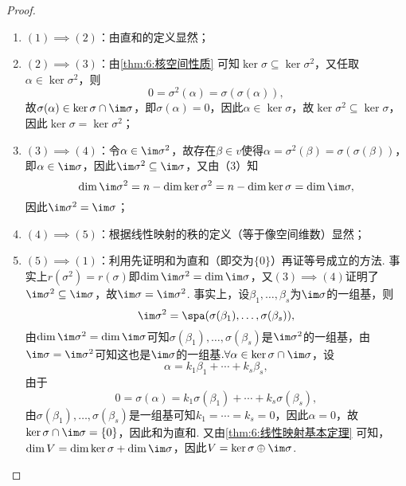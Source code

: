 \begin{enumerate}
          \begin{proof}
              \begin{enumerate}
                  \item $(1)\implies(2)$：由直和的定义显然；

                  \item $(2)\implies(3)$：由\autoref{thm:6:核空间性质} 可知$\ker\sigma\subseteq\ker\sigma^2$，又任取$\alpha\in\ker\sigma^2$，则
                        \[0=\sigma^2(\alpha)=\sigma(\sigma(\alpha)),\]故$\sigma(\alpha)\in\ker\sigma\cap\im\sigma$，即$\sigma(\alpha)=0$，因此$\alpha\in\ker\sigma$，故$\ker\sigma^2\subseteq\ker\sigma$，因此$\ker\sigma=\ker\sigma^2$；

                  \item $(3)\implies(4)$：令$\alpha\in\im\sigma^2$，故存在$\beta\in v$使得$\alpha=\sigma^2(\beta)=\sigma(\sigma(\beta))$，即$\alpha\in\im\sigma$，因此$\im\sigma^2\subseteq\im\sigma$，又由（3）知
                        \[\dim\im\sigma^2=n-\dim\ker\sigma^2=n-\dim\ker\sigma=\dim\im\sigma,\]
                        因此$\im\sigma^2=\im\sigma$；

                  \item $(4)\implies(5)$：根据线性映射的秩的定义（等于像空间维数）显然；

                  \item $(5)\implies(1)$：利用先证明和为直和（即交为$\{0\}$）再证等号成立的方法. 事实上$r(\sigma^2)=r(\sigma)$即$\dim\im\sigma^2=\dim\im\sigma$，又$(3)\implies(4)$证明了$\im\sigma^2\subseteq\im\sigma$，故$\im \sigma=\im \sigma^2$. 事实上，设$\beta_1,\ldots,\beta_s$为$\im\sigma$的一组基，则
                        \[\im\sigma^2=\spa(\sigma(\beta_1),\ldots,\sigma(\beta_s)),\]
                        由$\dim\im\sigma^2=\dim\im\sigma$可知$\sigma(\beta_1),\ldots,\sigma(\beta_s)$是$\im\sigma^2$的一组基，由$\im \sigma=\im \sigma^2$可知这也是$\im\sigma$的一组基$. \forall\alpha\in\ker\sigma\cap\im\sigma$，设
                        \[\alpha=k_1\beta_1+\cdots+k_s\beta_s,\]
                        由于
                        \[0=\sigma(\alpha)=k_1\sigma(\beta_1)+\cdots+k_s\sigma(\beta_s),\]
                        由$\sigma(\beta_1),\ldots,\sigma(\beta_s)$是一组基可知$k_1=\cdots=k_s=0$，因此$\alpha=0$，故$\ker\sigma\cap\im\sigma=\{0\}$，因此和为直和. 又由\autoref{thm:6:线性映射基本定理} 可知，$\dim V=\dim\ker\sigma+\dim\im \sigma$，因此$V=\ker\sigma\oplus\im \sigma$.
              \end{enumerate}
          \end{proof}


\end{enumerate}
